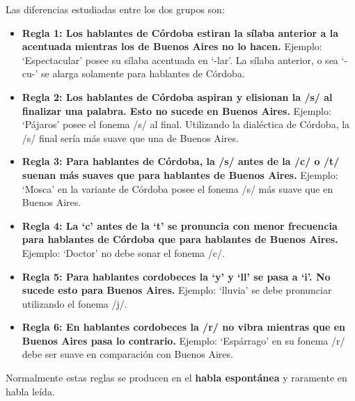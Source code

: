 \documentclass[a0,portrait]{a0poster}
\begin{document}
\begin{multicols}{2}
Las diferencias estudiadas entre los dos grupos son: 

\begin{itemize}
	
	\item \textbf{Regla 1: Los hablantes de Córdoba estiran la sílaba anterior a la acentuada mientras los de Buenos Aires no lo hacen.}  Ejemplo: `Espectacular' posee su sílaba acentuada en `-lar'. La sílaba anterior, o sea `-cu-' se alarga solamente para hablantes de Córdoba. 
	
	\item \textbf{Regla 2: Los hablantes de Córdoba aspiran y elisionan la /s/ al finalizar una palabra. Esto no sucede en Buenos Aires.} Ejemplo: `Pájaros' posee el fonema /s/ al final. Utilizando la dialéctica de Córdoba, la /s/ final sería más suave que una de Buenos Aires. 
	
	\item \textbf{Regla 3: Para hablantes de Córdoba, la /s/ antes de la /c/ o /t/ suenan más suaves que para hablantes de Buenos Aires.} Ejemplo: `Mosca' en la variante de Córdoba posee el fonema /s/ más suave que en Buenos Aires.
	
	\item \textbf{Regla 4: La `c' antes de la `t' se pronuncia con menor frecuencia para hablantes de Córdoba que para hablantes de Buenos Aires.} Ejemplo: `Doctor' no debe sonar el fonema /c/.
	
	\item \textbf{Regla 5: Para hablantes cordobeces la `y’ y `ll’ se pasa a `i’. No sucede esto para Buenos Aires.} Ejemplo: `lluvia' se debe pronunciar utilizando el fonema /j/. 
	
	\item \textbf{Regla 6: En hablantes cordobeces la /r/ no vibra mientras que en Buenos Aires pasa lo contrario.} Ejemplo: `Espárrago' en su fonema /r/ debe ser suave en comparación con Buenos Aires. 
	
\end{itemize}

Normalmente estas reglas se producen en el \textbf{habla espontánea} y raramente en habla leída. 


\color{DarkSlateGray} %


\end{multicols}
\end{document}
